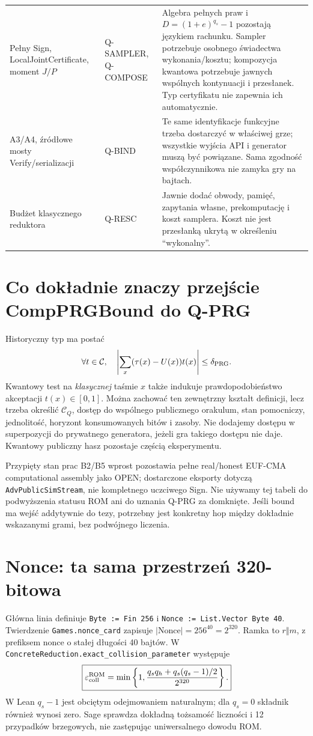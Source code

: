 \documentclass[11pt,a4paper]{article}
\newcommand{\code}[1]{\nolinkurl{#1}}
\begin{document}
\begin{longtable}{@{}p{.20\linewidth}p{.23\linewidth}p{.51\linewidth}@{}}
Pełny Sign, LocalJointCertificate, moment $J/P$ & Q-SAMPLER, Q-COMPOSE &
Algebra pełnych praw i $D=(1+e)^{q_s}-1$ pozostają językiem rachunku.
Sampler potrzebuje osobnego świadectwa wykonania/kosztu; kompozycja
kwantowa potrzebuje jawnych wspólnych kontynuacji i przesłanek.
Typ certyfikatu nie zapewnia ich automatycznie.\\
A3/A4, źródłowe mosty Verify/serializacji & Q-BIND & Te same identyfikacje
funkcyjne trzeba dostarczyć w właściwej grze; wszystkie wyjścia API i generator
muszą być powiązane. Sama zgodność współczynnikowa nie zamyka gry na bajtach.\\
Budżet klasycznego reduktora & Q-RESC & Jawnie dodać obwody, pamięć,
zapytania własne, prekomputację i koszt samplera. Koszt nie jest przesłanką
ukrytą w określeniu ``wykonalny''.\\\bottomrule
\end{longtable}\normalsize

\section{Co dokładnie znaczy przejście CompPRGBound do Q-PRG}
Historyczny typ ma postać
\[
 \forall t\in\mathcal C,\quad
 \left|\sum_x(\tau(x)-U(x))t(x)\right|\le\delta_{\rm PRG}.
\]
Kwantowy test na \emph{klasycznej} taśmie $x$ także indukuje prawdopodobieństwo
akceptacji $t(x)\in[0,1]$. Można zachować ten zewnętrzny kształt definicji,
lecz trzeba określić $\mathcal C_Q$, dostęp do wspólnego publicznego orakulum,
stan pomocniczy, jednolitość, horyzont konsumowanych bitów i zasoby.
Nie dodajemy dostępu w superpozycji do prywatnego generatora, jeżeli gra
takiego dostępu nie daje. Kwantowy publiczny hasz pozostaje częścią eksperymentu.

Przypięty stan prac B2/B5 wprost pozostawia pełne real/honest EUF-CMA
computational assembly jako OPEN; dostarczone eksporty dotyczą
\code{AdvPublicSimStream}, nie kompletnego uczciwego Sign.
Nie używamy tej tabeli do podwyższenia statusu ROM ani do uznania Q-PRG
za domknięte. Jeśli bound ma wejść addytywnie do tezy, potrzebny jest
konkretny hop między dokładnie wskazanymi grami, bez podwójnego liczenia.

\section{Nonce: ta sama przestrzeń 320-bitowa}
Główna linia definiuje \code{Byte := Fin 256} i
\code{Nonce := List.Vector Byte 40}. Twierdzenie \code{Games.nonce_card}
zapisuje $|\mathrm{Nonce}|=256^{40}=2^{320}$.
Ramka to $r\Vert m$, z prefiksem nonce o stałej długości 40 bajtów.
W \code{ConcreteReduction.exact_collision_parameter} występuje
\[
 \boxed{\varepsilon_{\rm coll}^{\rm ROM}
 =\min\left\{1,\frac{q_s q_h+q_s(q_s-1)/2}{2^{320}}\right\}.}
\]
W Lean $q_s-1$ jest obciętym odejmowaniem naturalnym; dla $q_s=0$ składnik
również wynosi zero. Sage sprawdza dokładną tożsamość liczności i 12
przypadków brzegowych, nie zastępując uniwersalnego dowodu ROM.
\end{document}
